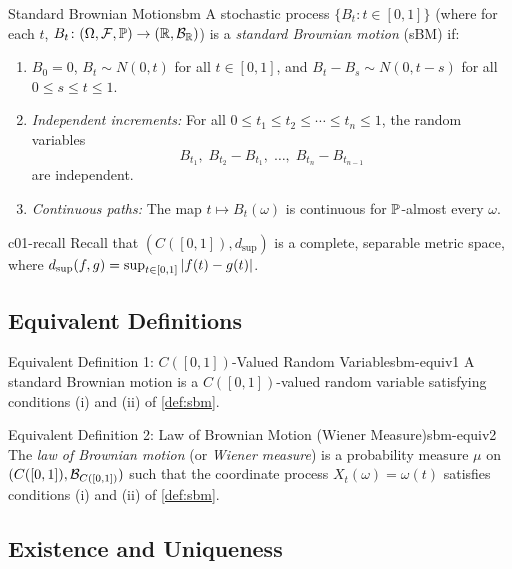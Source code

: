 \begin{definition}{Standard Brownian Motion}{sbm}
    A stochastic process $\{B_t : t \in [0,1]\}$ (where for each $t$, $B_t \colon (\Omega, \mathcal{F}, \mathbb{P}) \to (\mathbb{R}, \mathcal{B}_{\mathbb{R}})$) is a \emph{standard Brownian motion} (sBM) if:
    \begin{enumerate}[label=(\roman*)]
        \item $B_0 = 0$, $B_t \sim N(0, t)$ for all $t \in [0,1]$, and $B_t - B_s \sim N(0, t - s)$ for all $0 \leq s \leq t \leq 1$.
        \item \emph{Independent increments:} For all $0 \leq t_1 \leq t_2 \leq \cdots \leq t_n \leq 1$, the random variables
        \[
            B_{t_1},\; B_{t_2} - B_{t_1},\; \ldots,\; B_{t_n} - B_{t_{n-1}}
        \]
        are independent.
        \item \emph{Continuous paths:} The map $t \mapsto B_t(\omega)$ is continuous for $\mathbb{P}$-almost every $\omega$.
    \end{enumerate}
\end{definition}

\begin{remark}{}{c01-recall}
    Recall that $(C([0,1]), d_{\sup})$ is a complete, separable metric space, where $d_{\sup}(f,g) = \sup_{t \in [0,1]} \left|f(t) - g(t)\right|$.
\end{remark}

\subsection{Equivalent Definitions}

\begin{definition}{Equivalent Definition 1: $C([0,1])$-Valued Random Variable}{sbm-equiv1}
    A standard Brownian motion is a $C([0,1])$-valued random variable satisfying conditions (i) and (ii) of \cref{def:sbm}.
\end{definition}

\begin{definition}{Equivalent Definition 2: Law of Brownian Motion (Wiener Measure)}{sbm-equiv2}
    The \emph{law of Brownian motion} (or \emph{Wiener measure}) is a probability measure $\mu$ on $(C([0,1]), \mathcal{B}_{C([0,1])})$ such that the coordinate process $X_t(\omega) = \omega(t)$ satisfies conditions (i) and (ii) of \cref{def:sbm}.
\end{definition}

\subsection{Existence and Uniqueness}

